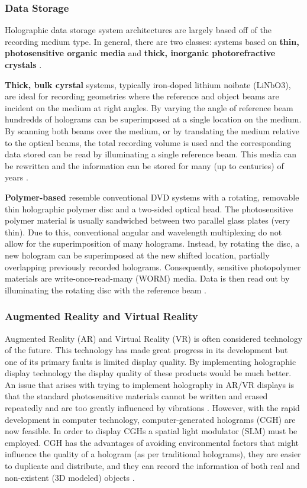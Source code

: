 \documentclass[12pt]{article}
\begin{document}
\subsubsection{Data Storage}

Holographic data storage system architectures are largely based off of the recording medium type. In general, there are two classes: systems based on \textbf{thin, photosensitive organic media} and \textbf{thick, inorganic photorefractive crystals} \cite{hesselink2004holographic}.

\textbf{Thick, bulk cyrstal} systems, typically iron-doped lithium noibate (LiNbO3), are ideal for recording geometries where the reference and object beams are incident on the medium at right angles. By varying the angle of reference beam hundredds of holograms can be superimposed at a single location on the medium. By scanning both beams over the medium, or by
translating the medium relative to the optical beams, the total recording volume is used and the corresponding data stored can be read by illuminating a single reference beam. This media can be rewritten and the information can be stored for many (up to centuries) of years \cite{hesselink2004holographic}.

\textbf{Polymer-based} resemble conventional DVD systems with a rotating, removable thin holographic polymer disc and a two-sided optical head. The photosensitive polymer material is usually sandwiched between two parallel glass plates (very thin). Due to this, conventional angular and wavelength multiplexing do not allow for the superimposition of many holograms.
Instead, by rotating the disc, a new hologram can be superimposed at the new shifted location, partially overlapping previously recorded holograms. Consequently, sensitive photopolymer materials are write-once-read-many (WORM) media. Data is then read out by illuminating the rotating disc with the reference beam \cite{hesselink2004holographic}.

\subsubsection{Augmented Reality and Virtual Reality}

Augmented Reality (AR) and Virtual Reality (VR) is often considered technology of the future. This technology has made great progress in its development but one of its primary faults is limited display quality. By implementing holographic display technology the display quality of these products would be much better.
An issue that arises with trying to implement holography in AR/VR displays is that the standard photosensitive materials cannot be written and erased repeatedly and are too greatly influenced by vibrations \cite{he2019progress}.
However, with the rapid development in computer technology, computer-generated holograms (CGH) are now feasible. In order to display CGHs a spatial light modulator (SLM) must be employed. CGH has the advantages of avoiding environmental factors that might influence the quality of a hologram (as per traditional holograms),
they are easier to duplicate and distribute, and they can record the information of both real and non-existent (3D modeled) objects \cite{he2019progress}.
\end{document}
